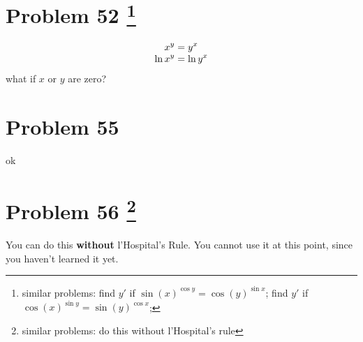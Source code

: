 \documentclass[10pt]{article} %
\begin{document}
\section*{Problem 52 \footnote{similar problems: 
	find $y'$ if $\sin(x)^{\cos y}=\cos(y)^{\sin x}$;
	find $y'$ if $\cos(x)^{\sin y}=\sin(y)^{\cos x}$;
}}
\begin{equation*}
	\begin{array}[]{c}
		\displaystyle x^y=y^x\\
		\displaystyle\ln x^y=\ln y^x
	\end{array}
\end{equation*}
what if $x$ or $y$ are zero?
\section*{Problem 55 }
ok
\section*{Problem 56  \footnote{similar problems: do this without l'Hospital's rule}}
You can do this \textbf{without} l'Hospital's Rule. You cannot use it at this point, since you haven't
learned it yet.
\end{document}
